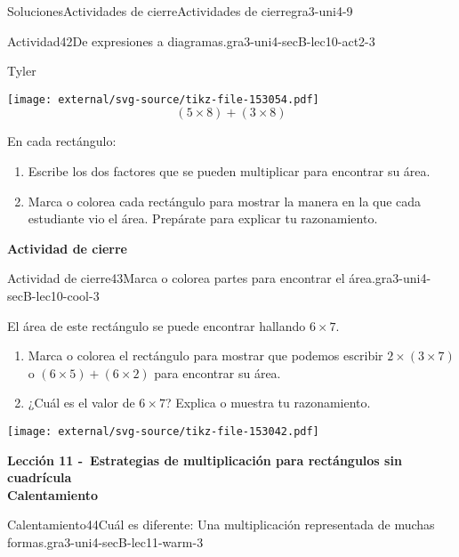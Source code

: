 \documentclass[twoside,10pt,]{article}
\begin{document}
\begin{solutions-section}{Soluciones}{Actividades de cierre}{}{Actividades de cierre}{}{}{gra3-uni4-9}
\begin{activitysolution}{Actividad}{42}{De expresiones a diagramas.}{gra3-uni4-secB-lec10-act2-3}
\begin{sidebyside}{3}{0.0166666666666667}{0.0166666666666667}{0.0333333333333333}
\begin{sbspanel}{0.3}%
Tyler%
\par
\texttt{[image: external/svg-source/tikz-file-153054.pdf]}
%
\begin{equation*}
(5 \times 8) + (3 \times 8)
\end{equation*}
%
\end{sbspanel}%
\end{sidebyside}%
\par
En cada rectángulo:%
%
\begin{enumerate}
\item{}Escribe los dos factores que se pueden multiplicar para encontrar su área.%
\item{}Marca o colorea cada rectángulo para mostrar la manera en la que cada estudiante vio el área. Prepárate para explicar tu razonamiento.%
\end{enumerate}
\end{activitysolution}%
\par\medskip
\noindent\textbf{\large{}\space\textperiodcentered\space{}Actividad de cierre}
\begin{projectsolution}{Actividad de cierre}{43}{Marca o colorea partes para encontrar el área.}{gra3-uni4-secB-lec10-cool-3}%
\begin{sidebyside}{2}{0}{0}{0}%
\begin{sbspanel}{0.6}%
El área de este rectángulo se puede encontrar hallando \(6 \times 7\).%
%
\begin{enumerate}
\item{}Marca o colorea el rectángulo para mostrar que podemos escribir \(2 \times (3 \times 7)\) o \((6 \times 5) + (6 \times 2)\) para encontrar su área.%
\item{}¿Cuál es el valor de \(6 \times 7\)? Explica o muestra tu razonamiento.%
\end{enumerate}
\end{sbspanel}%
\begin{sbspanel}{0.4}%
\texttt{[image: external/svg-source/tikz-file-153042.pdf]}
\end{sbspanel}%
\end{sidebyside}%
\end{projectsolution}%
\par\medskip
\noindent\textbf{\large{}\space\textperiodcentered\space{}Lección 11 -~Estrategias de multiplicación para rectángulos sin cuadrícula\\
\space\textperiodcentered\space{}Calentamiento}
\begin{explorationsolution}{Calentamiento}{44}{Cuál es diferente: Una multiplicación representada de muchas formas.}{gra3-uni4-secB-lec11-warm-3}%

\end{explorationsolution}
\end{solutions-section}
\end{document}
